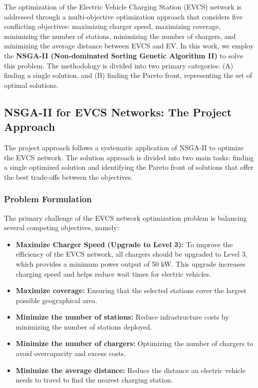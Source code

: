 The optimization of the Electric Vehicle Charging Station (EVCS) network is addressed through a multi-objective optimization approach that considers five conflicting objectives: maximizing charger speed, maximizing coverage, minimizing the number of stations, minimizing the number of chargers, and minimizing the average distance between EVCS and EV. In this work, we employ the \textbf{NSGA-II (Non-dominated Sorting Genetic Algorithm II)} to solve this problem. The methodology is divided into two primary categories: (A) finding a single solution, and (B) finding the Pareto front, representing the set of optimal solutions.

\subsection*{NSGA-II for EVCS Networks: The Project Approach}

The project approach follows a systematic application of NSGA-II to optimize the EVCS network. The solution approach is divided into two main tasks: finding a single optimized solution and identifying the Pareto front of solutions that offer the best trade-offs between the objectives.

\subsubsection{Problem Formulation}
The primary challenge of the EVCS network optimization problem is balancing several competing objectives, namely:
\begin{itemize}
    \item \textbf{Maximize Charger Speed (Upgrade to Level 3):} To improve the efficiency of the EVCS network, all chargers should be upgraded to Level 3, which provides a minimum power output of 50 kW. This upgrade increases charging speed and helps reduce wait times for electric vehicles.

    \item \textbf{Maximize coverage:} Ensuring that the selected stations cover the largest possible geographical area. 
    
    \item \textbf{Minimize the number of stations:} Reduce infrastructure costs by minimizing the number of stations deployed.
    
    \item \textbf{Minimize the number of chargers:} Optimizing the number of chargers to avoid overcapacity and excess costs.
    
    \item \textbf{Minimize the average distance:} Reduce the distance an electric vehicle needs to travel to find the nearest charging station.
\end{itemize}

